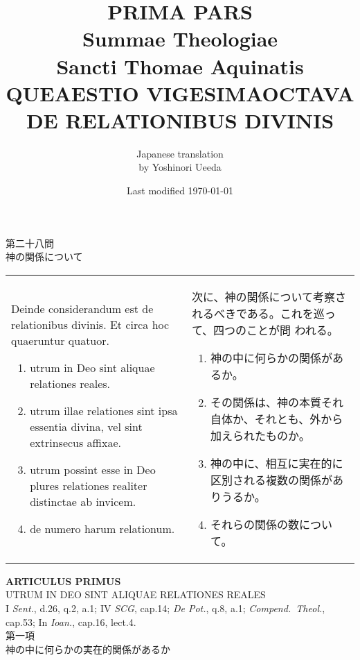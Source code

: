 \documentclass[10pt]{jsarticle} %
\title{{\bf PRIMA PARS}\\{\HUGE Summae Theologiae}\\Sancti Thomae
Aquinatis\\{\sffamily QUEAESTIO VIGESIMAOCTAVA}\\DE RELATIONIBUS DIVINIS}
\author{Japanese translation\\by Yoshinori {\sc Ueeda}}
\date{Last modified \today}
\begin{document}
\maketitle

\begin{center}
{\Large 第二十八問\\神の関係について}
\end{center}


\begin{longtable}{p{21em}p{21em}}

Deinde considerandum est de relationibus divinis. Et circa hoc
 quaeruntur quatuor. 


\begin{enumerate}
 \item utrum in Deo sint aliquae relationes reales.
 \item utrum illae relationes sint ipsa essentia divina, vel sint extrinsecus affixae.
 \item utrum possint esse in Deo plures relationes realiter distinctae ab invicem.
 \item de numero harum relationum.
\end{enumerate}


&

次に、神の関係について考察されるべきである。これを巡って、四つのことが問
 われる。

\begin{enumerate}
 \item 神の中に何らかの関係があるか。
 \item その関係は、神の本質それ自体か、それとも、外から加えられたものか。
 \item 神の中に、相互に実在的に区別される複数の関係がありうるか。
 \item それらの関係の数について。
\end{enumerate}


\end{longtable}



\newpage



\begin{center}
 {\Large {\bf ARTICULUS PRIMUS}}\\
 {\large UTRUM IN DEO SINT ALIQUAE RELATIONES REALES}\\
 {\footnotesize I {\itshape Sent.}, d.26, q.2, a.1; IV {\itshape SCG},
 cap.14; {\itshape De Pot.}, q.8, a.1; {\itshape Compend.~Theol.},
 cap.53; In {\itshape Ioan.}, cap.16, lect.4.}\\
 {\Large 第一項\\神の中に何らかの実在的関係があるか}
\end{center}
\end{document}
